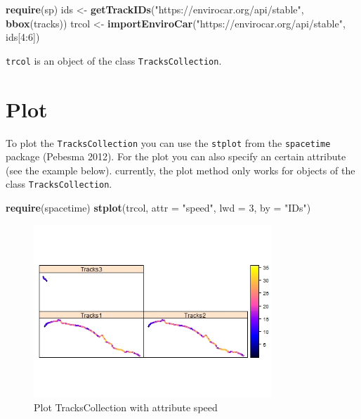 \documentclass[]{article}
\newenvironment{Shaded}{\begin{snugshade}}{\end{snugshade}}
\newcommand{\KeywordTok}[1]{\textcolor[rgb]{0.13,0.29,0.53}{\textbf{{#1}}}}
\newcommand{\DataTypeTok}[1]{\textcolor[rgb]{0.13,0.29,0.53}{{#1}}}
\newcommand{\DecValTok}[1]{\textcolor[rgb]{0.00,0.00,0.81}{{#1}}}
\newcommand{\StringTok}[1]{\textcolor[rgb]{0.31,0.60,0.02}{{#1}}}
\newcommand{\NormalTok}[1]{{#1}}
\begin{document}
\begin{Shaded}
\begin{Highlighting}[]
\KeywordTok{require}\NormalTok{(sp)}
\NormalTok{ids <-}\StringTok{ }\KeywordTok{getTrackIDs}\NormalTok{(}\StringTok{"https://envirocar.org/api/stable"}\NormalTok{, }\KeywordTok{bbox}\NormalTok{(tracks))}
\NormalTok{trcol <-}\StringTok{ }\KeywordTok{importEnviroCar}\NormalTok{(}\StringTok{"https://envirocar.org/api/stable"}\NormalTok{, ids[}\DecValTok{4}\NormalTok{:}\DecValTok{6}\NormalTok{])}
\end{Highlighting}
\end{Shaded}

\texttt{trcol} is an object of the class \texttt{TracksCollection}.

\section{Plot}\label{plot}

To plot the \texttt{TracksCollection} you can use the \texttt{stplot}
from the \texttt{spacetime} package (Pebesma 2012). For the plot you can
also specify an certain attribute (see the example below). currently,
the plot method only works for objects of the class
\texttt{TracksCollection}.

\begin{Shaded}
\begin{Highlighting}[]
\KeywordTok{require}\NormalTok{(spacetime)}
\KeywordTok{stplot}\NormalTok{(trcol, }\DataTypeTok{attr =} \StringTok{"speed"}\NormalTok{, }\DataTypeTok{lwd =} \DecValTok{3}\NormalTok{, }\DataTypeTok{by =} \StringTok{"IDs"}\NormalTok{)}
\end{Highlighting}
\end{Shaded}

\begin{figure}[h!]
  \centering
    \includegraphics[width=0.8\textwidth]{figures/stplot.png}
    \caption{Plot TracksCollection with attribute speed}
    \label{fig:st}
\end{figure}
\end{document}
